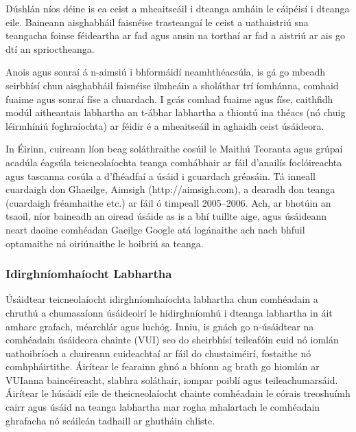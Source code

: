 \begin{multicols}{2}

Dúshlán níos déine is ea ceist a mheaitseáil i dteanga amháin le cáipéisí i dteanga eile. Baineann aisghabháil faisnéise trasteangaí  le ceist a uathaistriú sna teangacha foinse féideartha ar fad agus ansin na torthaí ar fad a aistriú ar ais go dtí an sprioctheanga. 

Anois agus sonraí á n-aimsiú i bhformáidí neamhthéacsúla, is gá go mbeadh seirbhísí chun aisghabháil faisnéise ilmheáin a sholáthar trí íomhánna, comhaid fuaime agus sonraí físe a chuardach. I gcás comhad fuaime agus físe, caithfidh modúl aitheantais labhartha an t-ábhar labhartha a thiontú ina théacs (nó chuig léirmhíniú foghraíochta) ar féidir é a mheaitseáil in aghaidh ceist úsáideora.

 In Éirinn, cuireann líon beag soláthraithe cosúil le Maithú Teoranta agus grúpaí acadúla éagsúla teicneolaíochta teanga comhábhair ar fáil d’anailís foclóireachta agus tascanna cosúla a d’fhéadfaí a úsáid i gcuardach gréasáin. Tá inneall cuardaigh don Ghaeilge, Aimsigh (http://aimsigh.com), a dearadh don teanga (cuardaigh fréamhaithe etc.) ar fáil ó timpeall 2005--2006. Ach, ar bhotúin an tsaoil, níor baineadh an oiread úsáide as is a bhí tuillte aige, agus úsáideann neart daoine comhéadan Gaeilge Google atá logánaithe ach nach bhfuil optamaithe ná oiriúnaithe le hoibriú sa teanga.
  
\subsubsection{Idirghníomhaíocht Labhartha}

Úsáidtear teicneolaíocht idirghníomhaíochta labhartha chun comhéadain a chruthú a chumasaíonn úsáideoirí le hidirghníomhú i dteanga labhartha in áit amharc grafach, méarchlár agus luchóg. Inniu, is gnách go n-úsáidtear na comhéadain úsáideora chainte (VUI) seo do sheirbhísí teileafóin cuid nó iomlán uathoibríoch a chuireann cuideachtaí ar fáil do chustaiméirí, fostaithe nó comhpháirtithe. Áirítear le fearainn ghnó a bhíonn ag brath go hiomlán ar VUIanna baincéireacht, slabhra soláthair, iompar poiblí agus teileachumarsáid. Áirítear le húsáidí eile de theicneolaíocht chainte comhéadain le córais treoshuímh cairr agus úsáid na teanga labhartha mar rogha mhalartach le comhéadain ghrafacha nó scáileán tadhaill ar ghutháin chliste.



\end{multicols}
